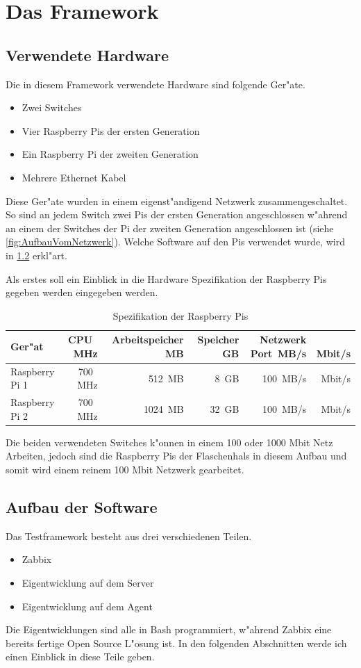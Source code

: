 \chapter{Das Framework}
\label{cha:framework}


\section{Verwendete Hardware} \label{sec:verwendeteHardware}
Die in diesem Framework verwendete Hardware sind folgende Ger"ate. %
\begin{itemize}
\item Zwei Switches
\item Vier Raspberry Pis der ersten Generation
\item Ein Raspberry Pi der zweiten Generation
\item Mehrere Ethernet Kabel
\end{itemize}
Diese Ger"ate wurden in einem eigenst"andigend Netzwerk zusammengeschaltet. So sind an jedem Switch zwei Pis %
der ersten Generation angeschlossen w"ahrend an einem der Switches der Pi der zweiten Generation angeschlossen %
ist (siehe \cref{fig:AufbauVomNetzwerk}). Welche Software auf den Pis verwendet wurde, wird in \cref{sec:aufbauSoftware} erkl"art. 

Als erstes soll  ein Einblick in die Hardware Spezifikation der Raspberry Pis gegeben werden eingegeben werden. 
\begin{table}
\centering
\begin{tabular}{l%
 r<{\,MHz}%
 r<{\,MB}%
 r<{\,GB}%
 r<{\,MB/s}%
 r<{\,Mbit/s}%
}
Ger"at 		& CPU	& Arbeitspeicher	& Speicher	& Netzwerk Port	\\
\hline
Raspberry Pi 1	& 700	& 512			& 8		& 100		\\
Raspberry Pi 2 	& 700 	& 1024			& 32		& 100		\\

\end{tabular}
\caption{Spezifikation der Raspberry Pis}
\label{tab:hardwarespezifiktion}
\end{table}

Die beiden verwendeten Switches k"onnen in einem 100 oder 1000 Mbit Netz Arbeiten, jedoch sind die Raspberry Pis der Flaschenhals in diesem %
Aufbau und somit wird einem reinem 100 Mbit Netzwerk gearbeitet. 

\section{Aufbau der Software} \label{sec:aufbauSoftware}
Das Testframework besteht aus drei verschiedenen Teilen. %
\begin{itemize}
\item Zabbix %
\item Eigentwicklung auf dem Server %
\item Eigentwicklung auf dem Agent %
\end{itemize}
Die Eigentwicklungen sind alle in Bash programmiert, w"ahrend Zabbix eine bereits fertige Open Source L"osung %
ist. In den folgenden Abschnitten werde ich einen Einblick in diese Teile geben. %

